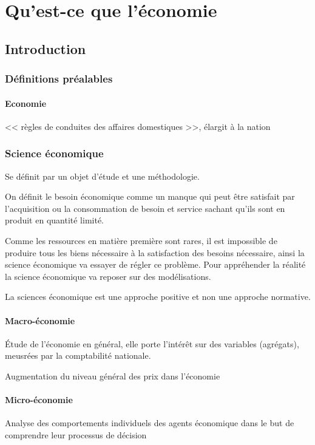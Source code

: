 \documentclass[12pt,a4paper,openany]{book}
\begin{document}
	\thispagestyle{empty} %
	\titleBC 
	\dominitoc
	\setcounter{tocdepth}{1}
	\setcounter{secnumdepth}{3}
	\setcounter{minitocdepth}{1}
	\tableofcontents
	\chapter{Qu'est-ce que l'économie}
	\section{Introduction}
	\subsection{Définitions préalables}
	\subsubsection{Economie}
		<< règles de conduites des affaires domestiques >>, élargit à la nation
		\subsection{Science économique}
		Se définit par un objet d'étude et une méthodologie.

	On définit le besoin économique comme un manque qui peut être satisfait par l'acquisition ou la consommation de besoin et service sachant qu'ils
	sont en produit en quantité limité.

	Comme les ressources en matière première sont rares, il est impossible de produire tous les biens nécessaire à la satisfaction des besoins
	nécessaire, ainsi la science économique va essayer de régler ce problème. Pour appréhender la réalité la science économique va reposer sur des
	modélisations.

	La sciences économique est une approche positive et non une approche normative.

	\subsubsection{Macro-économie}
	Étude de l'économie en général, elle porte l'intérêt sur des variables (agrégats), meusrées par la comptabilité nationale. 
	\begin{exemple}
		Augmentation du niveau général des prix dans l'économie	
	\end{exemple}
	\subsubsection{Micro-économie}
	Analyse des comportements individuels des agents économique dans le but de comprendre leur processus de décision
\end{document}
